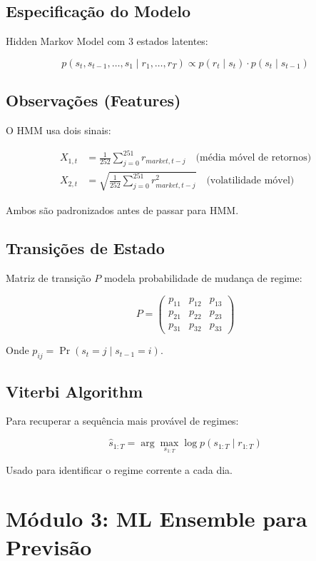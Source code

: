 \documentclass[12pt,a4paper]{article}
\begin{document}
\subsection{Especificação do Modelo}

Hidden Markov Model com 3 estados latentes:

\[
p(s_t, s_{t-1}, \ldots, s_1 \mid r_1, \ldots, r_T) \propto p(r_t \mid s_t) \cdot p(s_t \mid s_{t-1})
\]

\subsection{Observações (Features)}

O HMM usa dois sinais:

\begin{align}
X_{1,t} &= \frac{1}{252}\sum_{j=0}^{251} r_{market,t-j} \quad \text{(média móvel de retornos)} \\
X_{2,t} &= \sqrt{\frac{1}{252}\sum_{j=0}^{251} r_{market,t-j}^2} \quad \text{(volatilidade móvel)}
\end{align}

Ambos são padronizados antes de passar para HMM.

\subsection{Transições de Estado}

Matriz de transição $P$ modela probabilidade de mudança de regime:

\[
P = \begin{pmatrix}
p_{11} & p_{12} & p_{13} \\
p_{21} & p_{22} & p_{23} \\
p_{31} & p_{32} & p_{33}
\end{pmatrix}
\]

Onde $p_{ij} = \Pr(s_t = j \mid s_{t-1} = i)$.

\subsection{Viterbi Algorithm}

Para recuperar a sequência mais provável de regimes:

\[
\hat{s}_{1:T} = \arg\max_{s_{1:T}} \log p(s_{1:T} \mid r_{1:T})
\]

Usado para identificar o regime corrente a cada dia.

\section{Módulo 3: ML Ensemble para Previsão}
\end{document}

